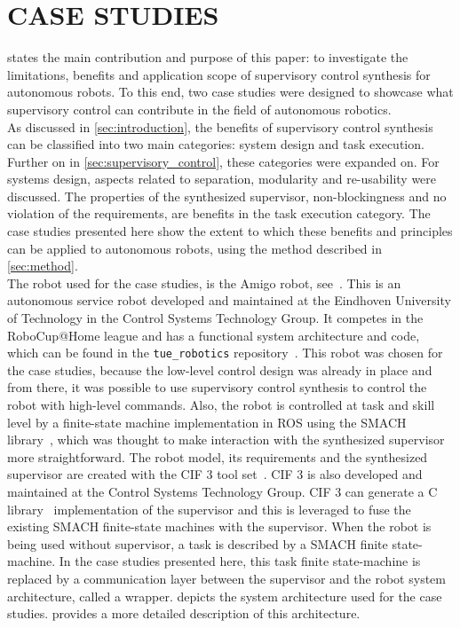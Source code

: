 \section{CASE STUDIES}\label{sec:case_studies}
 states the main contribution and purpose of this paper:
to investigate the limitations, benefits and application scope of supervisory control synthesis for autonomous robots.
To this end, two case studies were designed to showcase what supervisory control can contribute in the field of autonomous robotics.\\

As discussed in \cref{sec:introduction}, the benefits of supervisory control synthesis can be classified into two main categories: system design and task execution. 
Further on in \cref{sec:supervisory_control}, these categories were expanded on.
For systems design, aspects related to separation, modularity and re-usability were discussed.
The properties of the synthesized supervisor, non-blockingness and no violation of the requirements, are benefits in the task execution category.
The case studies presented here show the extent to which these benefits and principles can be applied to autonomous robots, using the method described in \cref{sec:method}.\\

The robot used for the case studies, is the Amigo robot, see~\cite{amigo_rop,amigo_ros,amigo_paper}. 
This is an autonomous service robot developed and maintained at the Eindhoven University of Technology in the Control Systems Technology Group. It competes in the RoboCup@Home league and has a functional system architecture and code, which can be found in the \texttt{tue\_robotics} repository~\cite{amigo_github}. 
This robot was chosen for the case studies, because the low-level control design was already in place and from there, it was possible to use supervisory control synthesis to control the robot with high-level commands. 
Also, the robot is controlled at task and skill level by a finite-state machine implementation in ROS using the SMACH library~\cite{smach}, which was thought to make interaction with the synthesized supervisor more straightforward.
The robot model, its requirements and the synthesized supervisor are created with the CIF 3 tool set~\cite{cif3}. CIF 3 is also developed and maintained at the Control Systems Technology Group.
CIF 3 can generate a C library~\cite{cif3_manual} implementation of the supervisor and this is leveraged to fuse the existing SMACH finite-state machines with the supervisor.
When the robot is being used without supervisor, a task is described by a SMACH finite state-machine.
In the case studies presented here, this task finite state-machine is replaced by a communication layer between the supervisor and the robot system architecture, called a wrapper. 
 depicts the system architecture used for the case studies.  provides a more detailed description of this architecture.\\

